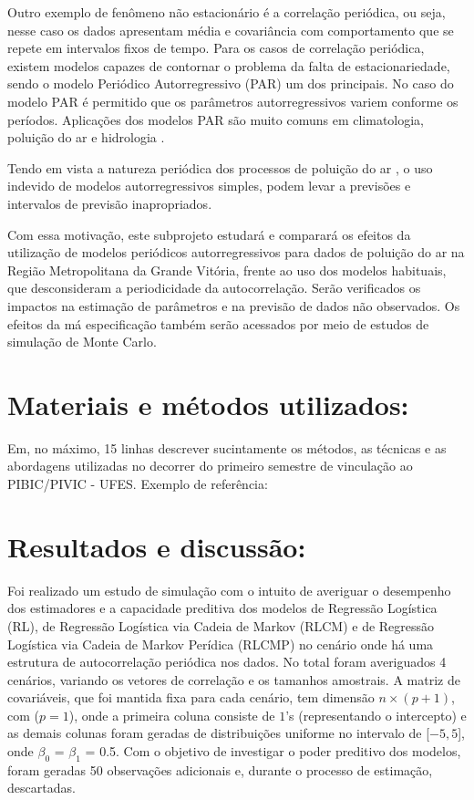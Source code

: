 \documentclass[10pt, a4paper]{article}
\begin{document}
Outro exemplo de fenômeno não estacionário é a correlação periódica, ou seja, nesse caso os dados apresentam média e covariância com comportamento que se repete em intervalos fixos de tempo. Para os casos de correlação periódica, existem modelos capazes de contornar o problema da falta de estacionariedade, sendo o modelo Periódico Autorregressivo (PAR) um dos principais. No caso do modelo PAR é permitido que os parâmetros autorregressivos variem conforme os períodos. Aplicações dos modelos PAR são muito comuns em climatologia, poluição do ar e hidrologia \citep{lund1995climatological, mcleod1995diagnostic, sarnaglia2010robust}.

Tendo em vista a natureza periódica dos processos de poluição do ar \citep{bloomfield1994periodic}, o uso indevido de modelos autorregressivos simples, podem levar a previsões e intervalos de previsão inapropriados.

Com essa motivação, este subprojeto estudará e comparará os efeitos da utilização de modelos periódicos autorregressivos para dados de poluição do ar na Região Metropolitana da Grande Vitória, frente ao uso dos modelos habituais, que desconsideram a periodicidade da autocorrelação. Serão verificados os impactos na estimação de parâmetros e na previsão de dados não observados. Os efeitos da má especificação também serão acessados por meio de estudos de simulação de Monte Carlo.

\section*{Materiais e métodos utilizados:}
Em, no máximo, 15 linhas descrever sucintamente os métodos, as técnicas e as abordagens utilizadas no decorrer do primeiro semestre de vinculação ao PIBIC/PIVIC - UFES.
Exemplo de referência: %


\section*{Resultados e discussão:}

Foi realizado um estudo de simulação com o intuito de averiguar o desempenho dos estimadores e a capacidade preditiva dos modelos de Regressão Logística (RL), de Regressão Logística via Cadeia de Markov (RLCM) e de Regressão Logística via Cadeia de Markov Perídica (RLCMP) no cenário onde há uma estrutura de autocorrelação periódica nos dados. No total foram averiguados 4 cenários, variando os vetores de correlação e os tamanhos amostrais. A matriz de covariáveis, que foi mantida fixa para cada cenário, tem dimensão $n \times (p + 1)$, com ($p = 1$), onde a primeira coluna consiste de $1$'s (representando o intercepto) e as demais colunas foram geradas de distribuições uniforme no intervalo de [$-5, 5$], onde $\beta_0$ = $\beta_1$ = 0.5. Com o objetivo de investigar o poder preditivo dos modelos, foram geradas 50 observações adicionais e, durante o processo de estimação, descartadas.
\end{document}
